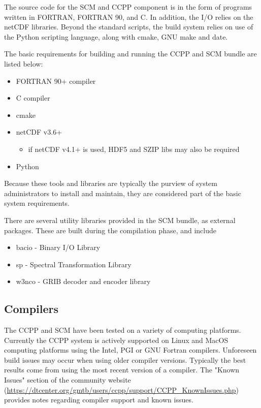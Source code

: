 The source code for the SCM and CCPP component is in the form
of programs written in FORTRAN, FORTRAN 90, and C. In addition, the I/O relies on the netCDF
libraries. Beyond the standard scripts, the build system relies
on use of the Python scripting language, along with cmake, GNU make and date.

The basic requirements for building and running the CCPP and SCM bundle are
listed below:

\begin{itemize}
	\item FORTRAN 90+ compiler
	\item C compiler
	\item cmake 
	\item netCDF v3.6+
        \begin{itemize}
	\item if netCDF v4.1+ is used, HDF5 and SZIP libs may also be required
\end{itemize}
	\item Python
\end{itemize}


Because these tools and libraries are typically the purview of
system administrators to install and maintain, they are considered 
part of the basic system requirements.


There are several utility libraries provided in the SCM bundle, as external packages.  These
are built during the compilation phase, and include


\begin{itemize}
	\item bacio - Binary I/O Library
	\item sp - Spectral Transformation Library
	\item w3nco - GRIB decoder and encoder library
\end{itemize}



\subsection{Compilers}
The CCPP and SCM have been tested on a variety of
computing platforms. Currently the CCPP system is actively supported
on Linux and MacOS computing platforms using the Intel, PGI or GNU Fortran
compilers. Unforeseen build issues may occur when using older
compiler versions. Typically the best results come from using the
most recent version of a compiler. The "Known Issues" section of the
community website (\url{https://dtcenter.org/gmtb/users/ccpp/support/CCPP_KnownIssues.php}) provides notes regarding compiler support and known issues.



